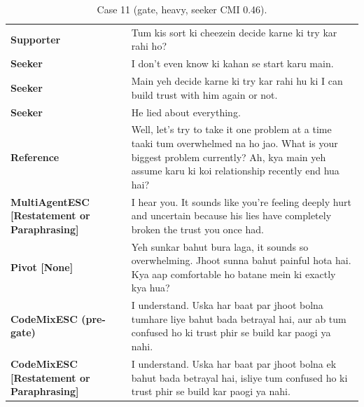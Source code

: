 \begin{table}[t]
\centering\footnotesize
\caption{Case 11 (gate, heavy, seeker CMI 0.46).}
\label{tab:case11}
\begin{tabular}{@{}p{}p{}@{}}
\toprule
\textbf{Supporter} & Tum kis sort ki cheezein decide karne ki try kar rahi ho? \\
\textbf{Seeker} & I don't even know ki kahan se start karu main. \\
\textbf{Seeker} & Main yeh decide karne ki try kar rahi hu ki I can build trust with him again or not. \\
\textbf{Seeker} & He lied about everything. \\
\textbf{Reference} & Well, let's try to take it one problem at a time taaki tum overwhelmed na ho jao. What is your biggest problem currently? Ah, kya main yeh assume karu ki koi relationship recently end hua hai? \\
\textbf{MultiAgentESC [Restatement or Paraphrasing]} & I hear you. It sounds like you're feeling deeply hurt and uncertain because his lies have completely broken the trust you once had. \\
\textbf{Pivot [None]} & Yeh sunkar bahut bura laga, it sounds so overwhelming. Jhoot sunna bahut painful hota hai. Kya aap comfortable ho batane mein ki exactly kya hua? \\
\textbf{CodeMixESC (pre-gate)} & I understand. Uska har baat par jhoot bolna tumhare liye bahut bada betrayal hai, aur ab tum confused ho ki trust phir se build kar paogi ya nahi. \\
\textbf{CodeMixESC [Restatement or Paraphrasing]} & I understand. Uska har baat par jhoot bolna ek bahut bada betrayal hai, isliye tum confused ho ki trust phir se build kar paogi ya nahi. \\
\bottomrule
\end{tabular}
\end{table}

